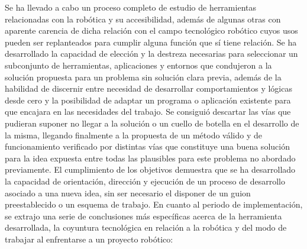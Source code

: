 Se ha llevado a cabo un proceso completo de estudio de herramientas relacionadas con la robótica y su accesibilidad, además de algunas otras con aparente carencia de dicha relación con el campo tecnológico robótico cuyos usos pueden ser replanteados para cumplir alguna función que sí tiene relación. Se ha desarrollado la capacidad de elección y la destreza necesarias para seleccionar un subconjunto de herramientas, aplicaciones y entornos que condujeron a la solución propuesta para un problema sin solución clara previa, además de la habilidad de discernir entre necesidad de desarrollar comportamientos y lógicas desde cero y la posibilidad de adaptar un programa o aplicación existente para que encajara en las necesidades del trabajo. Se consiguió descartar las vías que pudieran suponer no llegar a la solución o un cuello de botella en el desarrollo de la misma, llegando finalmente a la propuesta de un método válido y de funcionamiento verificado por distintas vías que constituye una buena solución para la idea expuesta entre todas las plausibles para este problema no abordado previamente. El cumplimiento de los objetivos demuestra que se ha desarrollado la capacidad de orientación, dirección y ejecución de un proceso de desarrollo asociado a una nueva idea, sin ser necesario el disponer de un guion preestablecido o un esquema de trabajo.
En cuanto al periodo de implementación, se extrajo una serie de conclusiones más específicas acerca de la herramienta desarrollada, la coyuntura tecnológica en relación a la robótica y del modo de trabajar al enfrentarse a un proyecto robótico:
